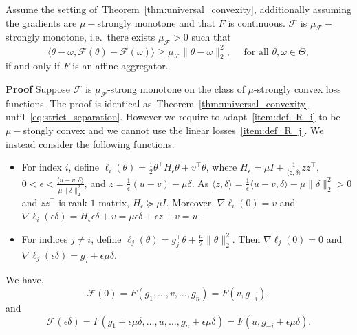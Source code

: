 \documentclass[twoside,11pt]{article}
\newcommand{\F}{\mathcal{F}}
\begin{document}
\begin{theorem}\label{thm:universal_strongmonotone}
    Assume the setting of~Theorem~\ref{thm:universal_convexity}, additionally assuming the gradients are $\mu-$strongly monotone and that $F$ is continuous.
    $\F$ is $\mu_\F-$strongly monotone, i.e.\ there exists $\mu_\F > 0$ such that
    \begin{equation}\label{eq:strongmonotone}
        \langle \theta - \omega, \F(\theta) - \F(\omega) \rangle \geq \mu_\F \| \theta - \omega \|^2_2, \quad\text{ for all } \theta, \omega \in \Theta,
    \end{equation}
    if and only if $F$ is an affine aggregator.
\end{theorem}
\textbf{Proof}\;
Suppose $\F$ is $\mu_\F$-strong monotone on the class of $\mu$-strongly convex loss functions.
The proof is identical as~Theorem~\ref{thm:universal_convexity} until~\eqref{eq:strict_separation}.
However we require to adapt~\ref{item:def_R_i} to be $\mu-$stongly convex and we cannot use the linear losses~\ref{item:def_R_j}.
We instead consider the following functions.
\begin{itemize}
    \item For index $i$, define $\ell_i(\theta) = \frac{1}{2} \theta^\intercal H_\epsilon \theta + v^\intercal \theta$, where $H_\epsilon = \mu I + \frac{1}{\langle z, \delta \rangle} zz^\intercal$, $0 < \epsilon < \frac{\langle u-v, \delta \rangle}{\mu \|\delta\|^2_2}$, and $z = \frac{1}{\epsilon}(u-v) - \mu \delta$.
    As $\langle z, \delta \rangle = \frac{1}{\epsilon}\langle u-v, \delta \rangle - \mu \|\delta\|_2^2 > 0$ and $zz^\intercal$ is rank $1$ matrix, $H_\epsilon \succeq \mu I$.  
    Moreover, $\nabla \ell_i(0) = v$ and $\nabla \ell_i(\epsilon \delta) = H_{\epsilon}\epsilon\delta + v = \mu\epsilon\delta + \epsilon z + v = u$.
    \item For indices $j \neq i$, define $\ell_j(\theta) = g_j^\intercal \theta + \frac{\mu}{2} \|\theta\|_2^2$. 
    Then $\nabla \ell_j(0) = 0$ and $\nabla \ell_j(\epsilon\delta) = g_j + \epsilon\mu\delta$.
\end{itemize}
We have,
\begin{equation*} 
    \F(0) = F(g_1, \dots, v, \dots, g_n) = F(v, g_{-i}),
\end{equation*}
and
\begin{equation*}
    \F(\epsilon\delta) = F(g_1 + \epsilon \mu \delta, \dots, u, \dots, g_n + \epsilon \mu \delta) = F(u, g_{-i} + \epsilon\mu\delta).
\end{equation*}
\end{document}
